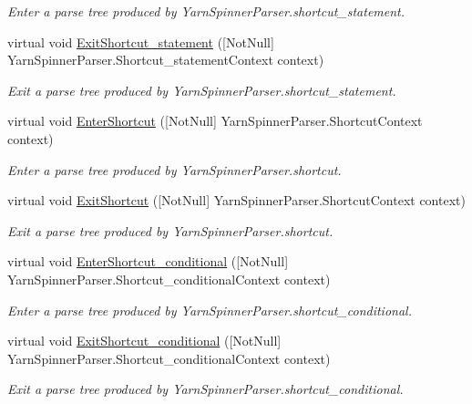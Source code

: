 \begin{DoxyCompactItemize}
\begin{DoxyCompactList}\small\item\em Enter a parse tree produced by Yarn\-Spinner\-Parser.\-shortcut\-\_\-statement. \end{DoxyCompactList}\item 
virtual void \hyperlink{a00196_aedbcd5225a20100938edb2b072515b2c}{Exit\-Shortcut\-\_\-statement} (\mbox{[}Not\-Null\mbox{]} Yarn\-Spinner\-Parser.\-Shortcut\-\_\-statement\-Context context)
\begin{DoxyCompactList}\small\item\em Exit a parse tree produced by Yarn\-Spinner\-Parser.\-shortcut\-\_\-statement. \end{DoxyCompactList}\item 
virtual void \hyperlink{a00196_ad110f7d08dcd1a8fd054ac34f5d42d7a}{Enter\-Shortcut} (\mbox{[}Not\-Null\mbox{]} Yarn\-Spinner\-Parser.\-Shortcut\-Context context)
\begin{DoxyCompactList}\small\item\em Enter a parse tree produced by Yarn\-Spinner\-Parser.\-shortcut. \end{DoxyCompactList}\item 
virtual void \hyperlink{a00196_a96270a7aa18e456051f1d17a0d391b87}{Exit\-Shortcut} (\mbox{[}Not\-Null\mbox{]} Yarn\-Spinner\-Parser.\-Shortcut\-Context context)
\begin{DoxyCompactList}\small\item\em Exit a parse tree produced by Yarn\-Spinner\-Parser.\-shortcut. \end{DoxyCompactList}\item 
virtual void \hyperlink{a00196_a476fa99e75445b668cc5bd7a5cf5e3e9}{Enter\-Shortcut\-\_\-conditional} (\mbox{[}Not\-Null\mbox{]} Yarn\-Spinner\-Parser.\-Shortcut\-\_\-conditional\-Context context)
\begin{DoxyCompactList}\small\item\em Enter a parse tree produced by Yarn\-Spinner\-Parser.\-shortcut\-\_\-conditional. \end{DoxyCompactList}\item 
virtual void \hyperlink{a00196_af600a0dc2204782118e7050560f37455}{Exit\-Shortcut\-\_\-conditional} (\mbox{[}Not\-Null\mbox{]} Yarn\-Spinner\-Parser.\-Shortcut\-\_\-conditional\-Context context)
\begin{DoxyCompactList}\small\item\em Exit a parse tree produced by Yarn\-Spinner\-Parser.\-shortcut\-\_\-conditional. \end{DoxyCompactList}\item 

\end{DoxyCompactItemize}
